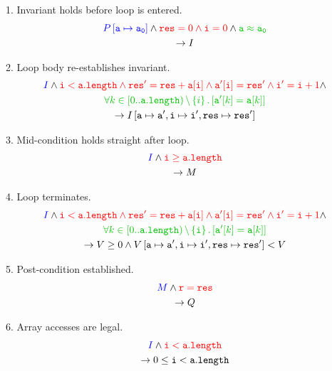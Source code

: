 \documentclass[10pt,twoside,twocolumn]{article}
\begin{document}
1. Invariant holds before loop is entered. 
\begin{multline*}
{\color{blue}P\left[\mathtt{a}\mapsto\mathtt{a}_{\mathtt{0}}\right]}\land{\color{red}\mathtt{res}=0\land\mathtt{i}=0}\land{\color{green}\mathtt{a}\approx\mathtt{a_{0}}}\\
\rightarrow I
\end{multline*}


2. Loop body re-establishes invariant. 
\begin{multline*}
{\color{blue}I}\land{\color{red}\mathtt{i}<\mathtt{a.length}\land\mathtt{res'}=\mathtt{res}+\mathtt{a[i]}\land\mathtt{a'[i]}=\mathtt{res'}\land\mathtt{i'}=\mathtt{i}+1}\land\\
{\color{green}\forall k\in\left[0..\mathtt{a.length}\right)\backslash\left\{ i\right\} .\left[\mathtt{a'}\mathtt{[}k\mathtt{]}=\mathtt{a[}k\mathtt{]}\right]}\\
\rightarrow I\left[\mathtt{a\mapsto a',i\mapsto i',res\mapsto res'}\right]
\end{multline*}


3. Mid-condition holds straight after loop. 
\begin{multline*}
{\color{blue}I}\land{\color{red}\mathtt{i}\geq\mathtt{a.length}}\\
\rightarrow M
\end{multline*}


4. Loop terminates. 
\begin{multline*}
{\color{blue}I}\land{\color{red}\mathtt{i}<\mathtt{a.length}\land\mathtt{res'}=\mathtt{res}+\mathtt{\mathtt{a[}i\mathtt{]}}\land\mathtt{\mathtt{a'[}i]}=\mathtt{res'}\land\mathtt{i'}=\mathtt{i}+1}\land\\
{\color{green}\forall k\in\left[0..\mathtt{a.length}\right)\backslash\left\{ \mathtt{i}\right\} .\left[\mathtt{\mathtt{a'}[}k\mathtt{]}=\mathtt{a[}k\mathtt{]}\right]}\\
\rightarrow V\geq0\land V\left[\mathtt{a\mapsto a',i\mapsto i',res\mapsto res'}\right]<V
\end{multline*}


5. Post-condition established. 
\begin{multline*}
{\color{blue}M}\land{\color{red}\mathtt{r=res}}\\
\rightarrow Q
\end{multline*}


6. Array accesses are legal. 
\begin{multline*}
{\color{blue}I}\land{\color{red}\mathtt{i<a.length}}\\
\rightarrow0\leq\mathtt{i<a.length}
\end{multline*}
\end{document}
